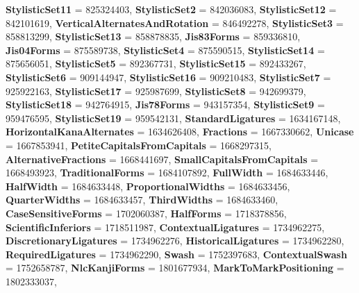 \begin{DoxyCompactItemize}
{\bfseries Stylistic\+Set11} = 825324403, 
\newline
{\bfseries Stylistic\+Set2} = 842036083, 
{\bfseries Stylistic\+Set12} = 842101619, 
{\bfseries Vertical\+Alternates\+And\+Rotation} = 846492278, 
{\bfseries Stylistic\+Set3} = 858813299, 
\newline
{\bfseries Stylistic\+Set13} = 858878835, 
{\bfseries Jis83\+Forms} = 859336810, 
{\bfseries Jis04\+Forms} = 875589738, 
{\bfseries Stylistic\+Set4} = 875590515, 
\newline
{\bfseries Stylistic\+Set14} = 875656051, 
{\bfseries Stylistic\+Set5} = 892367731, 
{\bfseries Stylistic\+Set15} = 892433267, 
{\bfseries Stylistic\+Set6} = 909144947, 
\newline
{\bfseries Stylistic\+Set16} = 909210483, 
{\bfseries Stylistic\+Set7} = 925922163, 
{\bfseries Stylistic\+Set17} = 925987699, 
{\bfseries Stylistic\+Set8} = 942699379, 
\newline
{\bfseries Stylistic\+Set18} = 942764915, 
{\bfseries Jis78\+Forms} = 943157354, 
{\bfseries Stylistic\+Set9} = 959476595, 
{\bfseries Stylistic\+Set19} = 959542131, 
\newline
{\bfseries Standard\+Ligatures} = 1634167148, 
{\bfseries Horizontal\+Kana\+Alternates} = 1634626408, 
{\bfseries Fractions} = 1667330662, 
{\bfseries Unicase} = 1667853941, 
\newline
{\bfseries Petite\+Capitals\+From\+Capitals} = 1668297315, 
{\bfseries Alternative\+Fractions} = 1668441697, 
{\bfseries Small\+Capitals\+From\+Capitals} = 1668493923, 
{\bfseries Traditional\+Forms} = 1684107892, 
\newline
{\bfseries Full\+Width} = 1684633446, 
{\bfseries Half\+Width} = 1684633448, 
{\bfseries Proportional\+Widths} = 1684633456, 
{\bfseries Quarter\+Widths} = 1684633457, 
\newline
{\bfseries Third\+Widths} = 1684633460, 
{\bfseries Case\+Sensitive\+Forms} = 1702060387, 
{\bfseries Half\+Forms} = 1718378856, 
{\bfseries Scientific\+Inferiors} = 1718511987, 
\newline
{\bfseries Contextual\+Ligatures} = 1734962275, 
{\bfseries Discretionary\+Ligatures} = 1734962276, 
{\bfseries Historical\+Ligatures} = 1734962280, 
{\bfseries Required\+Ligatures} = 1734962290, 
\newline
{\bfseries Swash} = 1752397683, 
{\bfseries Contextual\+Swash} = 1752658787, 
{\bfseries Nlc\+Kanji\+Forms} = 1801677934, 
{\bfseries Mark\+To\+Mark\+Positioning} = 1802333037, 
\newline

\end{DoxyCompactItemize}
